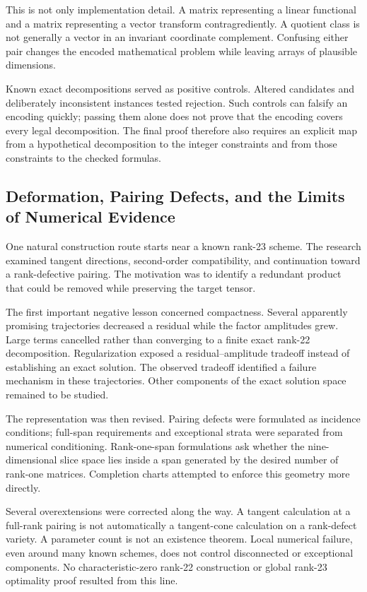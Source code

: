 This is not only implementation detail. A matrix representing a linear
functional and a matrix representing a vector transform contragrediently.
A quotient class is not generally a vector in an invariant coordinate
complement. Confusing either pair changes the encoded mathematical
problem while leaving arrays of plausible dimensions.

Known exact decompositions served as positive controls. Altered candidates
and deliberately inconsistent instances tested rejection. Such controls
can falsify an encoding quickly; passing them alone does not prove that
the encoding covers every legal decomposition. The final proof therefore
also requires an explicit map from a hypothetical decomposition to the
integer constraints and from those constraints to the checked formulas.

\subsection{Deformation, Pairing Defects, and the Limits of Numerical Evidence}
\label{route:deformation}

One natural construction route starts near a known rank-23 scheme.
The research examined tangent directions, second-order compatibility,
and continuation toward a rank-defective pairing. The motivation was to
identify a redundant product that could be removed while preserving the
target tensor.

The first important negative lesson concerned compactness. Several
apparently promising trajectories decreased a residual while the
factor amplitudes grew. Large terms cancelled rather than converging
to a finite exact rank-22 decomposition. Regularization exposed a
residual--amplitude tradeoff instead of establishing an exact solution.
The observed tradeoff identified a failure mechanism in these trajectories.
Other components of the exact solution space remained to be studied.

The representation was then revised. Pairing defects were formulated
as incidence conditions; full-span requirements and exceptional strata
were separated from numerical conditioning. Rank-one-span formulations
ask whether the nine-dimensional slice space lies inside a span generated
by the desired number of rank-one matrices. Completion charts attempted
to enforce this geometry more directly.

Several overextensions were corrected along the way. A tangent
calculation at a full-rank pairing is not automatically a tangent-cone
calculation on a rank-defect variety. A parameter count is not an
existence theorem. Local numerical failure, even around many known
schemes, does not control disconnected or exceptional components.
No characteristic-zero rank-22 construction or global rank-23
optimality proof resulted from this line.

